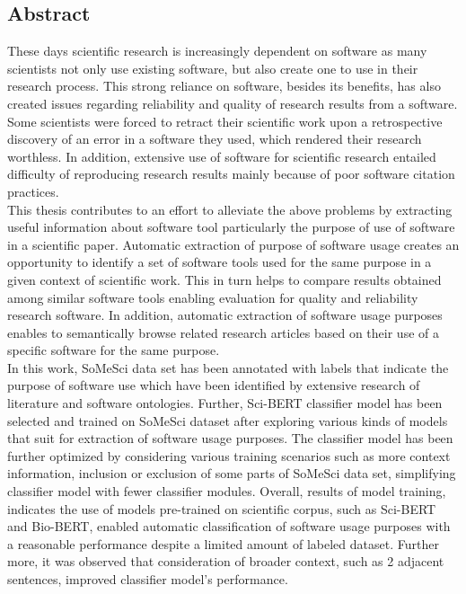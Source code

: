 

\begin{otherlanguage}{american}
	\chapter*{Abstract}

	\medskip
	
	\noindent

\end{otherlanguage}

These days scientific research is increasingly dependent on software as many scientists not only use existing software, but also create one to use in their research process. This strong reliance on software, besides its benefits, has also created issues regarding reliability and quality of research results from a software. Some scientists were forced to retract their scientific work upon a retrospective discovery of an error in a software they used, which rendered their research worthless. In addition, extensive use of software for scientific research entailed difficulty of reproducing research results mainly because of poor software citation practices. \\

This thesis contributes to an effort to alleviate the above problems by extracting useful information about software tool particularly the purpose of use of software in a scientific paper. Automatic extraction of purpose of software usage creates an opportunity to identify a set of software tools used for the same purpose in a given context of scientific work. This in turn helps to compare results obtained among similar software tools enabling evaluation for quality and reliability research software. In addition, automatic extraction of software usage purposes enables to semantically browse related research articles based on their use of a specific software for the same purpose. \\

In this work, SoMeSci data set has been annotated with labels that indicate the purpose of software use which have been identified by extensive research of literature and software ontologies. Further, Sci-BERT classifier model has been  selected and trained on SoMeSci dataset after exploring various kinds of models that suit for extraction of software usage purposes. The classifier model has been further optimized by considering various training scenarios such as more context information, inclusion or exclusion of some parts of SoMeSci data set, simplifying classifier model with fewer classifier modules. Overall, results of model training, indicates the use of models pre-trained on scientific corpus, such as Sci-BERT and Bio-BERT, enabled automatic classification of software usage purposes with a reasonable performance despite a limited amount of labeled dataset. Further more, it was observed that consideration of broader context, such as 2 adjacent sentences, improved classifier model’s performance.
